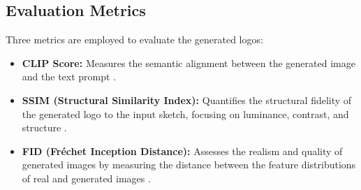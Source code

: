 \subsection{Evaluation Metrics}\label{subsec:bewertungsmetriken}
Three metrics are employed to evaluate the generated logos:
\begin{itemize}
	\item \textbf{CLIP Score:} Measures the semantic alignment between the generated image and the text prompt \cite{Hessel2021CLIPScoreAR}.
	\item \textbf{SSIM (Structural Similarity Index):} Quantifies the structural fidelity of the generated logo to the input sketch, focusing on luminance, contrast, and structure \cite{ssim_original}\cite[3]{snell2017learning}.
	\item \textbf{FID (Fréchet Inception Distance):} Assesses the realism and quality of generated images by measuring the distance between the feature distributions of real and generated images \cite[6]{heusel2017gans}.
\end{itemize}
